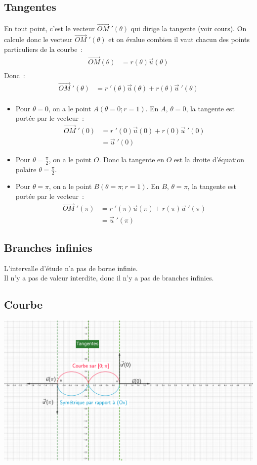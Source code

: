 \documentclass{article}
\newcounter{exo}
\begin{document}
\subsection{Tangentes}
En tout point, c'est le vecteur $\vec{OM}\; '(\theta)$ qui dirige la tangente (voir cours).
On calcule donc le vecteur $\vec{OM}\;'(\theta)$ et on évalue combien il vaut chacun des points
particuliers de la courbe~:
\begin{align*}
        \vec{OM}(\theta) & = r(\theta)\vec{u}(\theta) \\
\end{align*}
Donc~:
\begin{align*}
        \vec{OM}\;'(\theta) & = r\;'(\theta)\vec{u}(\theta) + r(\theta)\vec{u}\; '(\theta)\\
\end{align*}
\begin{itemize}
        \item Pour $\theta=0$, on a le point $A(\theta=0; r=1)$.
                En $A$, $\theta=0$, la tangente est portée par le vecteur~:
                \begin{align*}
                        \vec{OM}\;'(0) & = r\;'(0)\vec{u}(0) + r(0)\vec{u}\; '(0)\\
                                       & = \vec{u}\; '(0)
                \end{align*}
        \item Pour $\theta=\frac{\pi}{2}$, on a le point $O$.
                Donc la tangente en $O$ est la droite d'équation polaire $\theta=\frac{\pi}{2}$.
        \item Pour $\theta=\pi$, on a le point $B(\theta=\pi; r=1)$.
                En $B$, $\theta=\pi$, la tangente est portée par le vecteur~:
                \begin{align*}
                        \vec{OM}\;'(\pi) & = r\;'(\pi)\vec{u}(\pi) + r(\pi)\vec{u}\; '(\pi)\\
                                         & = \vec{u}\; '(\pi)
                \end{align*}
\end{itemize}
\subsection{Branches infinies}
L'intervalle d'étude n'a pas de borne infinie.\\
Il n'y a pas de valeur interdite, donc il n'y a pas de branches infinies.
\subsection{Courbe}
\includegraphics[width=\textwidth]{images/exo6.png}
\end{document}
